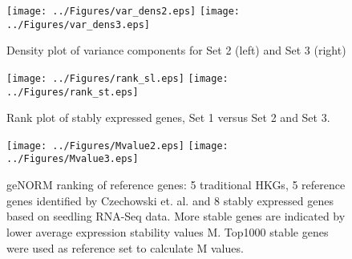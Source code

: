 \documentclass[11pt, a4paper]{article}
\begin{document}
 \begin{figure}[h]
\begin{center}
\texttt{[image: ../Figures/var\_dens2.eps]}
\texttt{[image: ../Figures/var\_dens3.eps]}
\caption{\label{sup:densityplot} Density plot of variance components for Set 2 (left) and Set 3 (right) }
\end{center}
\end{figure} 

 \begin{figure}[h!]
\begin{center}
\texttt{[image: ../Figures/rank\_sl.eps]}
\texttt{[image: ../Figures/rank\_st.eps]}
\caption{\label{fig:rankAgainstrank} Rank plot of stably expressed genes,  Set 1 versus Set 2 and Set 3.}
\end{center}
\end{figure}

 \begin{figure}[h!]
\begin{center}
\texttt{[image: ../Figures/Mvalue2.eps]}
\texttt{[image: ../Figures/Mvalue3.eps]}
\caption{\label{mvalue} geNORM ranking of reference genes: 5 traditional HKGs, 5 reference genes identified by Czechowski et. al. and 8 stably expressed genes based on seedling RNA-Seq data.  More stable genes are indicated by lower average expression stability values M. Top1000 stable genes were used as reference set to calculate M values.   }
\end{center}
\end{figure}


\newpage




\end{document}
